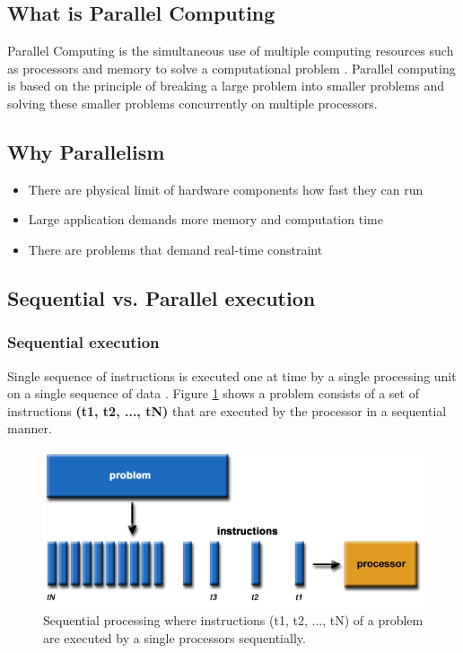\label{bg/parallel_computing}
\subsection {What is Parallel Computing}
Parallel Computing is the simultaneous use of multiple computing resources such as processors and memory to solve a computational problem \citep{Barney:16}. Parallel computing is based on the principle of breaking a large problem into smaller problems and solving these smaller problems concurrently on multiple processors.

\subsection{Why Parallelism}
\begin{itemize}
	\item There are physical limit of hardware components how fast they can run
	\item Large application demands more memory and computation time
	\item There are problems that demand real-time constraint
\end{itemize}

\subsection{Sequential vs. Parallel execution}

\subsubsection{Sequential execution}
Single sequence of instructions is executed one at time by a single processing unit on a single sequence of data \citep{Akl2009}. Figure \ref{fig:sequential-processing} shows a problem consists of a set of instructions \textbf{(t1, t2, ..., tN)} that are executed by the processor in a sequential manner.

\begin{figure}[!htb]
  \center
  \includegraphics[width=\linewidth]{figs/serialProblem.png}
  \caption{Sequential processing where instructions (t1, t2, ..., tN) of a problem are executed by a single processors sequentially. \citep{Barney:16}}
  \label{fig:sequential-processing}
  \center
\end{figure}


